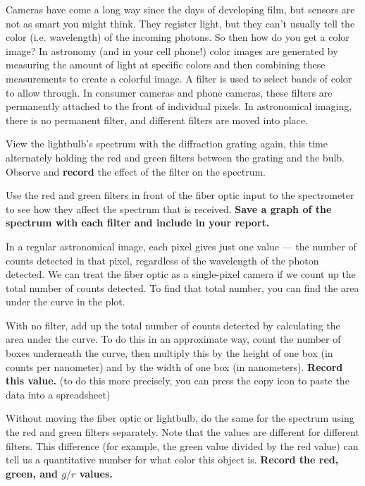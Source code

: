 Cameras have come a long way since the days of developing film, but sensors are not as smart you might think. They register light, but they can't usually tell the color (i.e. wavelength) of the incoming photons. So then how do you get a color image? In astronomy (and in your cell phone!) color images are generated by measuring the amount of light at specific colors and then combining these measurements to create a colorful image. A filter is used to select bands of color to allow through. In consumer cameras and phone cameras, these filters are permanently attached to the front of individual pixels. In astronomical imaging, there is no permanent filter, and different filters are moved into place.

\begin{steps}
	\item View the lightbulb's spectrum with the diffraction grating again, this time alternately holding the red and green filters between the grating and the bulb. Observe and \textbf{record} the effect of the filter on the spectrum.
	
	\item Use the red and green filters in front of the fiber optic input to the spectrometer to see how they affect the spectrum that is received. \textbf{Save a graph of the spectrum with each filter and include in your report.}
\end{steps}

In a regular astronomical image, each pixel gives just one value --- the number of counts detected in that pixel, regardless of the wavelength of the photon detected. We can treat the fiber optic as a single-pixel camera if we count up the total number of counts detected. To find that total number, you can find the area under the curve in the plot.

\begin{steps}
	\item With no filter, add up the total number of counts detected by calculating the area under the curve. To do this in an approximate way, count the number of boxes underneath the curve, then multiply this by the height of one box (in counts per nanometer) and by the width of one box (in nanometers). \textbf{Record this value.} (to do this more precisely, you can press the copy icon to paste the data into a spreadsheet)
	
	\item Without moving the fiber optic or lightbulb, do the same for the spectrum using the red and green filters separately. Note that the values are different for different filters. This difference (for example, the green value divided by the red value) can tell us a quantitative number for what color this object is. \textbf{Record the red, green, and $g/r$ values.}
\end{steps}

